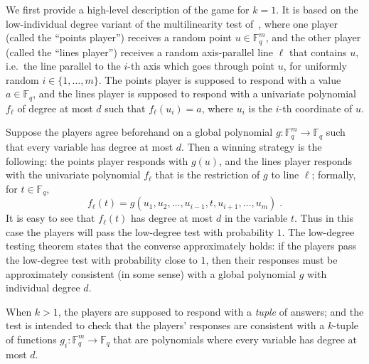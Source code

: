 \documentclass[11pt]{article}
\theoremstyle{definition}
\newcommand{\F}{\ensuremath{\mathbb{F}}}
\renewcommand{\line}{\mathbf{\ell}}
\begin{document}
We first provide a high-level description of the game for $k=1$.
It is based on the low-individual degree variant of the multilinearity test
of~\cite{babai1991non}, where one player (called the ``points player'') receives
a random point $u \in \F_q^m$, and the other player (called the ``lines
player'') receives a random axis-parallel line $\line$ that contains $u$, i.e.\
the line parallel to the $i$-th axis which goes through point $u$, for uniformly
random $i\in\{1,\ldots,m\}$.
The points player is supposed to respond with a value $a \in \F_q$, and the
lines player is supposed to respond with a univariate polynomial $f_\line$ of
degree at most $d$ such that $f_\line(u_i) = a$, where $u_i$ is the $i$-th
coordinate of $u$.

Suppose the players agree beforehand on a global polynomial $g: \F_q^m \to \F_q$
such that every variable has degree at most $d$.
Then a winning strategy is the following: the points player responds with
$g(u)$, and the lines player responds with the univariate polynomial $f_\line$
that is the restriction of $g$ to line $\line$; formally, for $t \in \F_q$,
\[f_\line(t)=g(u_1,u_2,\ldots,u_{i-1},t,u_{i+1},\ldots,u_m)\;.\] It is easy to
see that $f_\line(t)$ has degree at most $d$ in the variable $t$.
Thus in this case the players will pass the low-degree test with probability
$1$.
The low-degree testing theorem states that the converse approximately holds: if
the players pass the low-degree test with probability close to $1$, then their
responses must be approximately consistent (in some sense) with a global
polynomial $g$ with individual degree $d$.

When $k > 1$, the players are supposed to respond with a \emph{tuple} of
answers; and the test is intended to check that the players' responses are
consistent with a $k$-tuple of functions $g_i: \F_q^m \to \F_q$ that are
polynomials where every variable has degree at most $d$.
\end{document}
